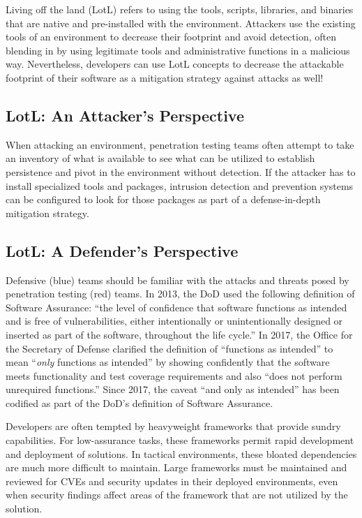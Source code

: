 Living off the land (LotL) refers to using the tools, scripts, libraries, and binaries that are native and pre-installed with the environment.\autocite[\pno~299]{20210621:rains2020cybersecurity} Attackers use the existing tools of an environment to decrease their footprint and avoid detection, often blending in by using legitimate tools and administrative functions in a malicious way.\autocite[\pno~45]{20210621:calder2020cyber} Nevertheless, developers can use LotL concepts to decrease the attackable footprint of their software as a mitigation strategy against attacks as well!

\subsection{LotL: An Attacker's Perspective}

When attacking an environment, penetration testing teams often attempt to take an inventory of what is available to see what can be utilized to establish persistence and pivot in the environment without detection. If the attacker has to install specialized tools and packages, intrusion detection and prevention systems can be configured to look for those packages as part of a defense-in-depth mitigation strategy.

\subsection{LotL: A Defender's Perspective}

Defensive (blue) teams should be familiar with the attacks and threats posed by penetration testing (red) teams. In 2013, the DoD used the following definition of Software Assurance: ``the level of confidence that software functions as intended and is free of vulnerabilities, either intentionally or unintentionally designed or inserted as part of the software, throughout the life cycle.''\autocite[\pno~255 §933.e.2]{20210621:ndaa2013} In 2017, the Office for the Secretary of Defense clarified the definition of ``functions as intended'' to mean ``\textit{only} functions as intended'' by showing confidently that the software meets functionality and test coverage requirements and also ``does not perform unrequired functions.''\autocite[\pno~7]{20210617:marien2017} Since 2017, the caveat ``and only as intended'' has been codified as part of the DoD's definition of Software Assurance.\autocite[\pno~2]{20210617:hurt2017}

Developers are often tempted by heavyweight frameworks that provide sundry capabilities. For low-assurance tasks, these frameworks permit rapid development and deployment of solutions. In tactical environments, these bloated dependencies are much more difficult to maintain. Large frameworks must be maintained and reviewed for CVEs and security updates in their deployed environments, even when security findings affect areas of the framework that are not utilized by the solution.


